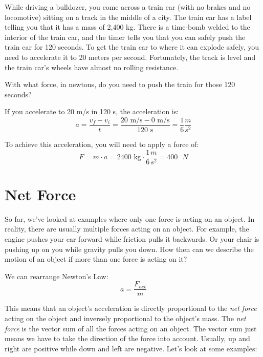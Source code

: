 \begin{Exercise}[title={Acceleration}, label=acceleration_train]

While driving a bulldozer, you come across a train car (with no brakes
and no locomotive) sitting on a track in the middle of a city. The train car
has a label telling you that it has a mass of 2,400 kg. There is a time-bomb
welded to the interior of the train car, and the timer tells you that
you can safely push the train car for 120 seconds. To get the train
car to where it can explode safely, you need to accelerate it to 20 meters per
second. Fortunately, the track is level and the train car's wheels have
almost no rolling resistance.

With what force, in newtons, do you need to push the train for those 120 seconds?

\end{Exercise}
\begin{Answer}[ref=acceleration_train]
If you accelerate to 20 m/s in 120 s, the acceleration is:
$$a = \frac{v_f - v_i}{t} = \frac{20\text{ m/s} - 0\text{ m/s}}{120\text{ s}} = 
\frac{1}{6} \frac{m}{s^2}$$

To achieve this acceleration, you will need to apply a force of:
$$F = m \cdot a = 2400\text{ kg} \cdot \frac{1}{6} \frac{m}{s^2} = 400\text{ }N$$
\end{Answer}

\section{Net Force}
So far, we've looked at examples where only one force is acting on an object. In 
reality, there are usually multiple forces acting on an object. For example, the 
engine pushes your car forward while friction pulls it backwards. Or your chair 
is pushing up on you while gravity pulls you down. How then can we describe the 
motion of an object if more than one force is acting on it?

We can rearrange Newton's Law:
$$a = \frac{F_{net}}{m}$$

This means that an object's acceleration is directly proportional to the 
\textit{net force} acting on the object and inversely proportional to the object's 
mass. The \textit{net force} is the vector sum of all the forces acting on an 
object. The vector sum just means we have to take the direction of 
the force into account. Usually, up and right are positive while down and left are 
negative. Let's look at some examples:

